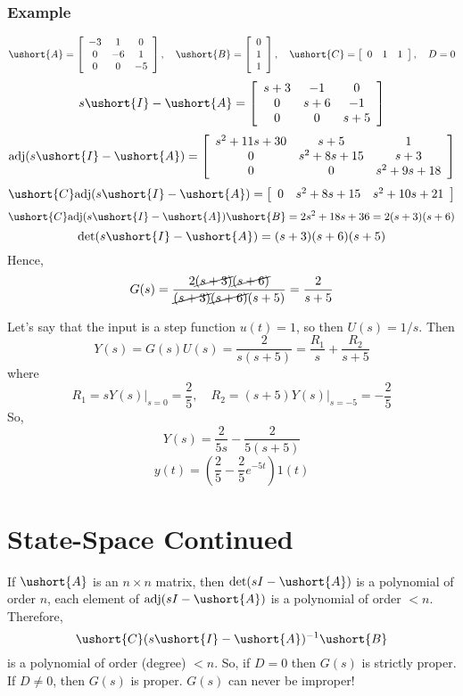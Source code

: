 \documentclass{book}
\newcommand{\adj}{\text{adj}}
\def\ubar#1{\ushort{#1}}
\newcommand{\exmp}{\subsubsection*{Example}}
\begin{document}
\exmp
\[ \ubar{A}=\left[\begin{array}{c c c} -3 & 1 & 0 \\ 0 & -6 & 1 \\ 0 & 0 & -5 \end{array}\right], \quad \ubar{B} = \left[\begin{array}{c} 0\\ 1\\ 1 \end{array}\right],\quad \ubar{C}=\left[\begin{array}{c c c} 0&1&1\end{array}\right],\quad D=0 \]
\[ s\ubar{I}-\ubar{A} = \left[\begin{array}{c c c} s+3 & -1 & 0 \\ 0 & s+6 & -1 \\ 0 & 0 & s+5 \end{array}\right] \]
\[ \adj(s\ubar{I}-\ubar{A}) = \left[\begin{array}{c c c} s^2+11s+30 & s+5 & 1 \\ 0 & s^2+8s+15 & s+3 \\ 0 & 0 & s^2+9s+18 \end{array}\right] \]
\[ \ubar{C}\adj(s\ubar{I}-\ubar{A}) = \left[\begin{array}{c c c} 0 & s^2+8s+15 & s^2+10s+21\end{array}\right] \]
\[ \ubar{C}\adj(s\ubar{I}-\ubar{A})\ubar{B} = 2s^2+18s+36 = 2(s+3)(s+6) \]
\[ \det(s\ubar{I}-\ubar{A}) = (s+3)(s+6)(s+5)\]
Hence,
\[ G(s) = \frac{2\cancel{(s+3)}\cancel{(s+6)}}{\cancel{(s+3)}\cancel{(s+6)}(s+5)} = \frac{2}{s+5} \]
	

Let's say that the input is a step function $ u(t)=1 $, so then $ U(s)=1/s $. Then
\[ Y(s) = G(s)U(s) = \frac{2}{s(s+5)} = \frac{R_1}{s}+\frac{R_2}{s+5} \]
where
\[ R_1=sY(s)\Big|_{s=0} = \frac{2}{5},\quad R_2=(s+5)Y(s)\Big|_{s=-5} = -\frac{2}{5} \]
So,
\[ Y(s) = \frac{2}{5s}-\frac{2}{5(s+5)} \]
\[ y(t) = \left(\frac{2}{5} -\frac{2}{5}e^{-5t}   \right) 1(t) \]

\section*{State-Space Continued}
If $ \ubar{A} $ is an $ n\times n $ matrix, then $ \det(sI-{\ubar{A}}) $ is a polynomial of order $ n $, each element of $ \adj(sI-{\ubar{A}}) $ is a polynomial of order $ <n $. Therefore,
\[ \ubar{C}(s\ubar{I}-\ubar{A})^{-1}\ubar{B}\]
is a polynomial of order (degree) $ <n $. So, if $ D=0 $ then $ G(s) $ is strictly proper. If $ D\neq0 $, then $ G(s) $ is proper. $ G(s) $ can never be improper!
\end{document}
